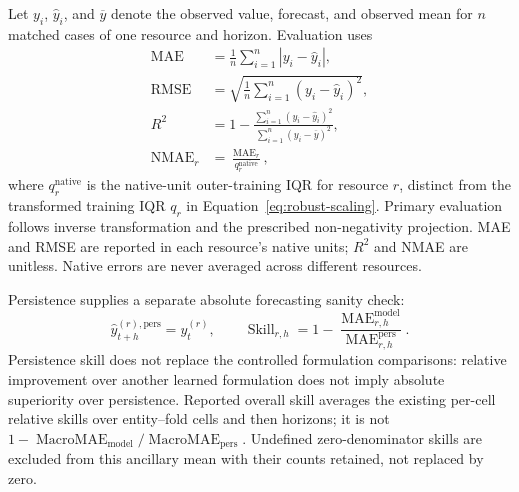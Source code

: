 \documentclass[5p,twocolumn]{elsarticle}
\begin{document}
Let $y_i$, $\widehat{y}_i$, and $\overline{y}$ denote the observed value,
forecast, and observed mean for $n$ matched cases of one resource and horizon.
Evaluation uses
\begin{equation}
  \begin{aligned}
    \operatorname{MAE} &= \frac{1}{n}\sum_{i=1}^{n}|y_i-\widehat{y}_i|, \\
    \operatorname{RMSE} &=
      \sqrt{\frac{1}{n}\sum_{i=1}^{n}(y_i-\widehat{y}_i)^2}, \\
    R^2 &= 1-
      \frac{\sum_{i=1}^{n}(y_i-\widehat{y}_i)^2}
           {\sum_{i=1}^{n}(y_i-\overline{y})^2}, \\
    \operatorname{NMAE}_r &= \frac{\operatorname{MAE}_r}{q_r^{\mathrm{native}}},
  \end{aligned}
  \label{eq:evaluation-metrics}
\end{equation}
where $q_r^{\mathrm{native}}$ is the native-unit outer-training IQR for resource
$r$, distinct from the transformed training IQR $q_r$ in
Equation~\ref{eq:robust-scaling}. Primary evaluation follows inverse
transformation and the prescribed non-negativity projection. MAE and RMSE are
reported in each resource's native units; $R^2$ and NMAE are unitless.  Native
errors are never averaged across different resources.

Persistence supplies a separate absolute forecasting sanity check:
\begin{equation}
  \widehat{y}_{t+h}^{(r),\mathrm{pers}}=y_t^{(r)},
  \qquad
  \operatorname{Skill}_{r,h}
  =1-\frac{\operatorname{MAE}_{r,h}^{\mathrm{model}}}
           {\operatorname{MAE}_{r,h}^{\mathrm{pers}}}.
  \label{eq:persistence-skill}
\end{equation}
Persistence skill does not replace the controlled formulation comparisons:
relative improvement over another learned formulation does not imply absolute
superiority over persistence. Reported overall skill averages the existing
per-cell relative skills over entity--fold cells and then horizons; it is not
$1-\operatorname{MacroMAE}_{\mathrm{model}}/
\operatorname{MacroMAE}_{\mathrm{pers}}$. Undefined zero-denominator skills
are excluded from this ancillary mean with their counts retained, not
replaced by zero.
\end{document}
